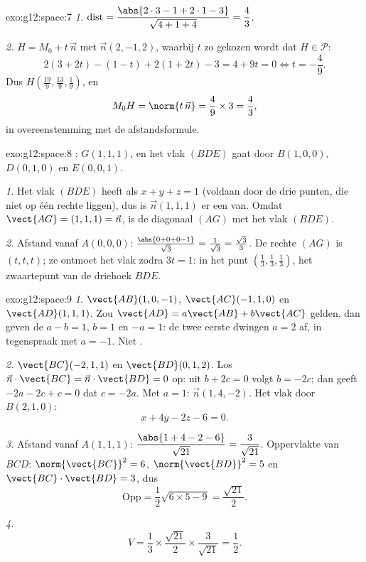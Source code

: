 \begin{solution}{exo:g12:space:7}
\emph{1.} $\operatorname{dist} = \dfrac{\abs{2\cdot3 - 1 + 2\cdot1 - 3}}
{\sqrt{4 + 1 + 4}} = \dfrac{4}{3}$.

\emph{2.} $H = M_0 + t\,\vec n$ met $\vec n(2, -1, 2)$, waarbij $t$ zo gekozen
wordt dat $H \in \mathcal P$:
\[
2(3 + 2t) - (1 - t) + 2(1 + 2t) - 3 = 4 + 9t = 0 \iff t = -\frac49 .
\]
Dus $H\left(\frac{19}{9}, \frac{13}{9}, \frac19\right)$, en
\[
M_0H = \norm{t\,\vec n} = \frac49 \times 3 = \frac43,
\]
in overeenstemming met de afstandsformule.
\end{solution}

\begin{solution}{exo:g12:space:8}
: $G(1,1,1)$, en het vlak $(BDE)$ gaat door $B(1,0,0)$,
$D(0,1,0)$ en $E(0,0,1)$.

\emph{1.} Het vlak $(BDE)$ heeft als  $x + y + z = 1$ (voldaan
door de drie punten, die niet op één rechte liggen), dus is $\vec n(1,1,1)$
er een  van. Omdat $\vect{AG} = (1,1,1) = \vec n$, is de
diagonaal $(AG)$  met het vlak $(BDE)$.

\emph{2.} Afstand vanaf $A(0,0,0)$:
$\frac{\abs{0 + 0 + 0 - 1}}{\sqrt3} = \frac{1}{\sqrt3} = \frac{\sqrt3}{3}$.
De rechte $(AG)$ is $(t, t, t)$; ze ontmoet het vlak zodra $3t = 1$: in het
punt $\left(\frac13, \frac13, \frac13\right)$, het zwaartepunt van de
driehoek $BDE$.
\end{solution}

\begin{solution}{exo:g12:space:9}
\emph{1.} $\vect{AB}(1, 0, -1)$, $\vect{AC}(-1, 1, 0)$ en
$\vect{AD}(1, 1, 1)$. Zou $\vect{AD} = a\vect{AB} + b\vect{AC}$ gelden, dan
geven de  $a - b = 1$, $b = 1$ en $-a = 1$: de twee eerste dwingen
$a = 2$ af, in tegenspraak met $a = -1$. Niet .

\emph{2.} $\vect{BC}(-2, 1, 1)$ en $\vect{BD}(0, 1, 2)$. Los
$\vec n \cdot \vect{BC} = \vec n \cdot \vect{BD} = 0$ op: uit $b + 2c = 0$
volgt $b = -2c$; dan geeft $-2a - 2c + c = 0$ dat $c = -2a$. Met $a = 1$:
$\vec n(1, 4, -2)$. Het vlak door $B(2,1,0)$:
\[
x + 4y - 2z - 6 = 0 .
\]

\emph{3.} Afstand vanaf $A(1,1,1)$:
$\dfrac{\abs{1 + 4 - 2 - 6}}{\sqrt{21}} = \dfrac{3}{\sqrt{21}}$.
Oppervlakte van $BCD$: $\norm{\vect{BC}}^2 = 6$, $\norm{\vect{BD}}^2 = 5$ en
$\vect{BC}\cdot\vect{BD} = 3$, dus
\[
\text{Opp} = \frac12\sqrt{6 \times 5 - 9} = \frac{\sqrt{21}}{2}.
\]

\emph{4.}
\[
V = \frac13 \times \frac{\sqrt{21}}{2} \times \frac{3}{\sqrt{21}}
= \frac12 .
\]
\end{solution}

